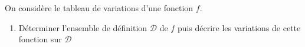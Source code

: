\begin{exo}{}
	On considère le tableau de variations d'une fonction $f$.

	\vspace*{2mm}
	\begin{center}
	\end{center}
	\begin{enumerate}
	\item Déterminer l'ensemble de définition $\mathcal{D}$ de $f$ puis décrire les variations de cette fonction sur $\mathcal{D}$
	\end{enumerate}
\end{exo}
